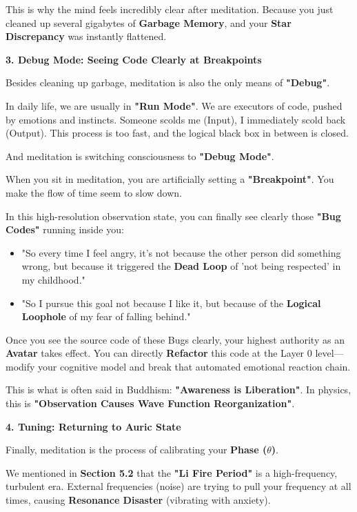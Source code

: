 This is why the mind feels incredibly clear after meditation. Because you just cleaned up several gigabytes of \textbf{Garbage Memory}, and your \textbf{Star Discrepancy} was instantly flattened.

\textbf{3. Debug Mode: Seeing Code Clearly at Breakpoints}

Besides cleaning up garbage, meditation is also the only means of \textbf{"Debug"}.

In daily life, we are usually in \textbf{"Run Mode"}. We are executors of code, pushed by emotions and instincts. Someone scolds me (Input), I immediately scold back (Output). This process is too fast, and the logical black box in between is closed.

And meditation is switching consciousness to \textbf{"Debug Mode"}.

When you sit in meditation, you are artificially setting a \textbf{"Breakpoint"}. You make the flow of time seem to slow down.

In this high-resolution observation state, you can finally see clearly those \textbf{"Bug Codes"} running inside you:

\begin{itemize}
\item "So every time I feel angry, it's not because the other person did something wrong, but because it triggered the \textbf{Dead Loop} of 'not being respected' in my childhood."
\item "So I pursue this goal not because I like it, but because of the \textbf{Logical Loophole} of my fear of falling behind."
\end{itemize}

Once you see the source code of these Bugs clearly, your highest authority as an \textbf{Avatar} takes effect. You can directly \textbf{Refactor} this code at the Layer 0 level—modify your cognitive model and break that automated emotional reaction chain.

This is what is often said in Buddhism: \textbf{"Awareness is Liberation"}. In physics, this is \textbf{"Observation Causes Wave Function Reorganization"}.

\textbf{4. Tuning: Returning to Auric State}

Finally, meditation is the process of calibrating your \textbf{Phase ($\theta$)}.

We mentioned in \textbf{Section 5.2} that the \textbf{"Li Fire Period"} is a high-frequency, turbulent era. External frequencies (noise) are trying to pull your frequency at all times, causing \textbf{Resonance Disaster} (vibrating with anxiety).

